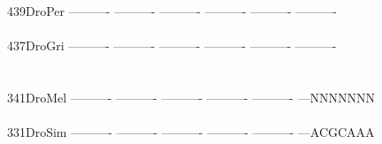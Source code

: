 \documentclass[11pt,twoside,reqno,a4paper]{article}
\begin{document}
{439\hspace*{1\charwidth}DroPer	----------	----------	----------	----------	----------	----------	\\
\hspace*{4\charwidth}\hspace*{7\charwidth}\hspace*{1\charwidth}\hspace*{1\charwidth}\hspace*{1\charwidth}\hspace*{1\charwidth}\hspace*{1\charwidth}\hspace*{1\charwidth}\\
437\hspace*{1\charwidth}DroGri	----------	----------	----------	----------	----------	----------	\\
\hspace*{4\charwidth}\hspace*{7\charwidth}\hspace*{1\charwidth}\hspace*{1\charwidth}\hspace*{1\charwidth}\hspace*{1\charwidth}\hspace*{1\charwidth}\hspace*{1\charwidth}\\
\\
341\hspace*{1\charwidth}DroMel	----------	----------	----------	----------	----------	---NNNNNNN	\\
\hspace*{4\charwidth}\hspace*{7\charwidth}\hspace*{1\charwidth}\hspace*{1\charwidth}\hspace*{1\charwidth}\hspace*{1\charwidth}\hspace*{1\charwidth}\hspace*{1\charwidth}\\
331\hspace*{1\charwidth}DroSim	----------	----------	----------	----------	----------	---ACGCAAA	\\
\hspace*{4\charwidth}\hspace*{7\charwidth}\hspace*{1\charwidth}\hspace*{1\charwidth}\hspace*{1\charwidth}\hspace*{1\charwidth}\hspace*{1\charwidth}\hspace*{1\charwidth}\\
}
\end{document}
